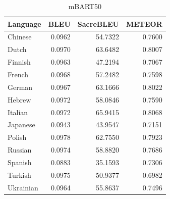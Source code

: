 \documentclass[a4paper]{article}
\begin{document}
\begin{table}[htbp]
\begin{minipage}{0.49\linewidth}
\begin{tabular}{|l|r|r|r|}
            \hline
            \textbf{Language} & \textbf{BLEU} & \textbf{SacreBLEU} & \textbf{METEOR} \\
            \hline
            Chinese           & 0.0962        & 54.7322            & 0.7600          \\
            Dutch             & 0.0970        & 63.6482            & 0.8007          \\
            Finnish           & 0.0963        & 47.2194            & 0.7067          \\
            French            & 0.0968        & 57.2482            & 0.7598          \\
            German            & 0.0967        & 63.1666            & 0.8022          \\
            Hebrew            & 0.0972        & 58.0846            & 0.7590          \\
            Italian           & 0.0972        & 65.9415            & 0.8068          \\
            Japanese          & 0.0943        & 43.9547            & 0.7151          \\
            Polish            & 0.0978        & 62.7550            & 0.7923          \\
            Russian           & 0.0974        & 58.8820            & 0.7686          \\
            Spanish           & 0.0883        & 35.1593            & 0.7306          \\
            Turkish           & 0.0975        & 50.9377            & 0.6982          \\
            Ukrainian         & 0.0964        & 55.8637            & 0.7496          \\
            \hline
        \end{tabular}
        \caption{mBART50}
    \end{minipage}
\end{table}
\end{document}
